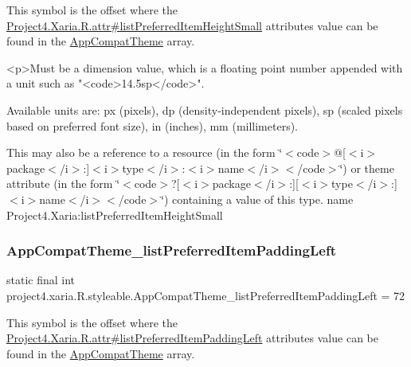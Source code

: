 This symbol is the offset where the \hyperlink{}{Project4.\+Xaria.\+R.\+attr\#list\+Preferred\+Item\+Height\+Small} attribute\textquotesingle{}s value can be found in the \hyperlink{classproject4_1_1xaria_1_1R_1_1styleable_aad8bec413e2350f9404e6ff0e831a85d}{App\+Compat\+Theme} array.

\begin{DoxyVerb}      <p>Must be a dimension value, which is a floating point number appended with a unit such as "<code>14.5sp</code>".
\end{DoxyVerb}
 Available units are\+: px (pixels), dp (density-\/independent pixels), sp (scaled pixels based on preferred font size), in (inches), mm (millimeters). 

This may also be a reference to a resource (in the form \char`\"{}$<$code$>$@\mbox{[}$<$i$>$package$<$/i$>$\+:\mbox{]}$<$i$>$type$<$/i$>$\+:$<$i$>$name$<$/i$>$$<$/code$>$\char`\"{}) or theme attribute (in the form \char`\"{}$<$code$>$?\mbox{[}$<$i$>$package$<$/i$>$\+:\mbox{]}\mbox{[}$<$i$>$type$<$/i$>$\+:\mbox{]}$<$i$>$name$<$/i$>$$<$/code$>$\char`\"{}) containing a value of this type.  name Project4.\+Xaria\+:list\+Preferred\+Item\+Height\+Small \mbox{\label{classproject4_1_1xaria_1_1R_1_1styleable_aacb89a8e9a344b6bb4f794a6a33a8f1c}} 
\subsubsection{\texorpdfstring{App\+Compat\+Theme\+\_\+list\+Preferred\+Item\+Padding\+Left}{AppCompatTheme\_listPreferredItemPaddingLeft}}
{\footnotesize\ttfamily static final int project4.\+xaria.\+R.\+styleable.\+App\+Compat\+Theme\+\_\+list\+Preferred\+Item\+Padding\+Left = 72\hspace{0.3cm}{\ttfamily [static]}}

This symbol is the offset where the \hyperlink{}{Project4.\+Xaria.\+R.\+attr\#list\+Preferred\+Item\+Padding\+Left} attribute\textquotesingle{}s value can be found in the \hyperlink{classproject4_1_1xaria_1_1R_1_1styleable_aad8bec413e2350f9404e6ff0e831a85d}{App\+Compat\+Theme} array.

